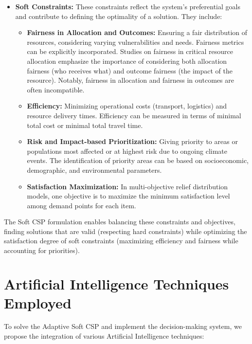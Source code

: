 \documentclass[letterpaper]{article}
\begin{document}
\begin{itemize}
    \item \textbf{Soft Constraints:} These constraints reflect the system’s preferential goals and contribute to defining the optimality of a solution. They include:
          \begin{itemize}
              \item \textbf{Fairness in Allocation and Outcomes:} Ensuring a fair distribution of resources, considering varying vulnerabilities and needs. Fairness metrics can be explicitly incorporated. Studies on fairness in critical resource allocation emphasize the importance of considering both allocation fairness (who receives what) and outcome fairness (the impact of the resource). Notably, fairness in allocation and fairness in outcomes are often incompatible.
              \item \textbf{Efficiency:} Minimizing operational costs (transport, logistics) and resource delivery times. Efficiency can be measured in terms of minimal total cost or minimal total travel time.
              \item \textbf{Risk and Impact-based Prioritization:} Giving priority to areas or populations most affected or at highest risk due to ongoing climate events. The identification of priority areas can be based on socioeconomic, demographic, and environmental parameters.
              \item \textbf{Satisfaction Maximization:} In multi-objective relief distribution models, one objective is to maximize the minimum satisfaction level among demand points for each item.
          \end{itemize}
\end{itemize}

The Soft CSP formulation enables balancing these constraints and objectives, finding solutions that are valid (respecting hard constraints) while optimizing the satisfaction degree of soft constraints (maximizing efficiency and fairness while accounting for priorities).

\section{Artificial Intelligence Techniques Employed}
To solve the Adaptive Soft CSP and implement the decision-making system, we propose the integration of various Artificial Intelligence techniques:
\end{document}
